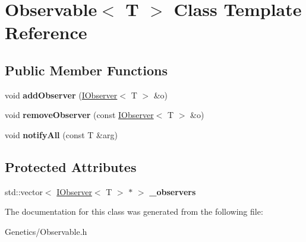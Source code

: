 \hypertarget{class_observable}{}\section{Observable$<$ T $>$ Class Template Reference}
\label{class_observable}
\subsection*{Public Member Functions}
\begin{DoxyCompactItemize}
\item 
void {\bfseries add\+Observer} (\hyperlink{struct_i_observer}{I\+Observer}$<$ T $>$ \&o)\hypertarget{class_observable_a5caccd0c60c6e11843be0ee0197d34e1}{}\label{class_observable_a5caccd0c60c6e11843be0ee0197d34e1}

\item 
void {\bfseries remove\+Observer} (const \hyperlink{struct_i_observer}{I\+Observer}$<$ T $>$ \&o)\hypertarget{class_observable_a88784c910caefa3a830025209d71adb3}{}\label{class_observable_a88784c910caefa3a830025209d71adb3}

\item 
void {\bfseries notify\+All} (const T \&arg)\hypertarget{class_observable_a2f2f224a73edbb6d42f6534ba0d28602}{}\label{class_observable_a2f2f224a73edbb6d42f6534ba0d28602}

\end{DoxyCompactItemize}
\subsection*{Protected Attributes}
\begin{DoxyCompactItemize}
\item 
std\+::vector$<$ \hyperlink{struct_i_observer}{I\+Observer}$<$ T $>$ $\ast$ $>$ {\bfseries \+\_\+observers}\hypertarget{class_observable_a21f00b2d8f33fafe8aaa2360998d1d62}{}\label{class_observable_a21f00b2d8f33fafe8aaa2360998d1d62}

\end{DoxyCompactItemize}


The documentation for this class was generated from the following file\+:\begin{DoxyCompactItemize}
\item 
Genetics/Observable.\+h\end{DoxyCompactItemize}
